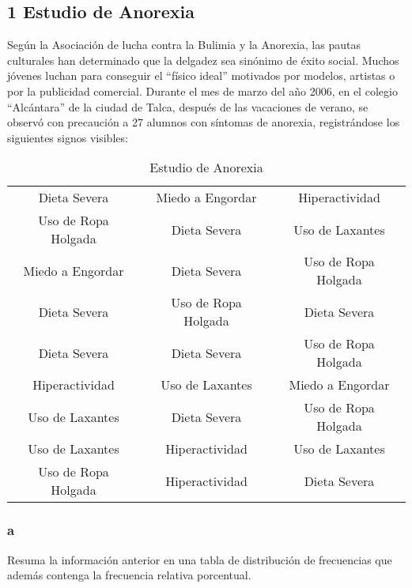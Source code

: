 \documentclass{templateNote}
\begin{document}
\begin{samepage}
    \subsection{1 Estudio de Anorexia}
    \indent
    Según la Asociación de lucha contra la Bulimia y la Anorexia, las pautas culturales
    han determinado que la delgadez sea sinónimo de éxito social. Muchos jóvenes luchan para
    conseguir el “físico ideal” motivados por modelos, artistas o por la publicidad comercial.
    Durante el mes de marzo del año 2006, en el colegio “Alcántara” de la ciudad de Talca,
    después de las vacaciones de verano, se observó con precaución a 27 alumnos con síntomas
    de anorexia, registrándose los siguientes signos visibles:

    \begin{table}[H]
        \begin{center}
            \begin{tabular}{| c | c | c |}
                \hline Dieta Severa & Miedo a Engordar & Hiperactividad \\
                Uso de Ropa Holgada & Dieta Severa & Uso de Laxantes \\
                Miedo a Engordar & Dieta Severa & Uso de Ropa Holgada \\
                Dieta Severa & Uso de Ropa Holgada & Dieta Severa \\
                Dieta Severa & Dieta Severa & Uso de Ropa Holgada \\
                Hiperactividad & Uso de Laxantes & Miedo a Engordar \\
                Uso de Laxantes & Dieta Severa & Uso de Ropa Holgada \\
                Uso de Laxantes & Hiperactividad & Uso de Laxantes \\
                Uso de Ropa Holgada & Hiperactividad & Dieta Severa \\ \hline
            \end{tabular}
            \caption{Estudio de Anorexia}
        \end{center}
    \end{table}

    
    \subsubsection{a}
    \indent
    Resuma la información anterior en una tabla de distribución de frecuencias que además contenga la frecuencia relativa porcentual.
    

\end{samepage}
\end{document}
